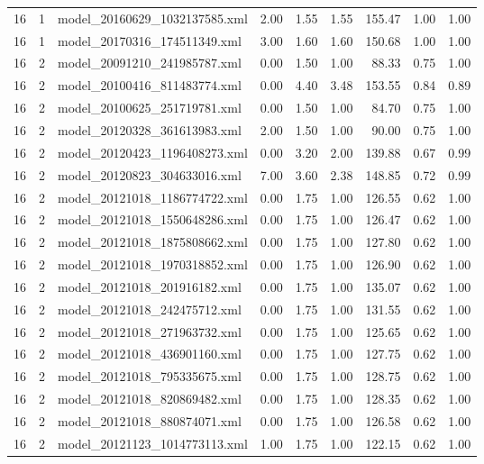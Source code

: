 \begin{table}[ht]
\begin{tabular}{rrlrrrrrr}
   16 &   1 & model\_20160629\_1032137585.xml & 2.00 & 1.55 & 1.55 & 155.47 & 1.00 & 1.00 \\ 
   16 &   1 & model\_20170316\_174511349.xml & 3.00 & 1.60 & 1.60 & 150.68 & 1.00 & 1.00 \\ 
   16 &   2 & model\_20091210\_241985787.xml & 0.00 & 1.50 & 1.00 & 88.33 & 0.75 & 1.00 \\ 
   16 &   2 & model\_20100416\_811483774.xml & 0.00 & 4.40 & 3.48 & 153.55 & 0.84 & 0.89 \\ 
   16 &   2 & model\_20100625\_251719781.xml & 0.00 & 1.50 & 1.00 & 84.70 & 0.75 & 1.00 \\ 
   16 &   2 & model\_20120328\_361613983.xml & 2.00 & 1.50 & 1.00 & 90.00 & 0.75 & 1.00 \\ 
   16 &   2 & model\_20120423\_1196408273.xml & 0.00 & 3.20 & 2.00 & 139.88 & 0.67 & 0.99 \\ 
   16 &   2 & model\_20120823\_304633016.xml & 7.00 & 3.60 & 2.38 & 148.85 & 0.72 & 0.99 \\ 
   16 &   2 & model\_20121018\_1186774722.xml & 0.00 & 1.75 & 1.00 & 126.55 & 0.62 & 1.00 \\ 
   16 &   2 & model\_20121018\_1550648286.xml & 0.00 & 1.75 & 1.00 & 126.47 & 0.62 & 1.00 \\ 
   16 &   2 & model\_20121018\_1875808662.xml & 0.00 & 1.75 & 1.00 & 127.80 & 0.62 & 1.00 \\ 
   16 &   2 & model\_20121018\_1970318852.xml & 0.00 & 1.75 & 1.00 & 126.90 & 0.62 & 1.00 \\ 
   16 &   2 & model\_20121018\_201916182.xml & 0.00 & 1.75 & 1.00 & 135.07 & 0.62 & 1.00 \\ 
   16 &   2 & model\_20121018\_242475712.xml & 0.00 & 1.75 & 1.00 & 131.55 & 0.62 & 1.00 \\ 
   16 &   2 & model\_20121018\_271963732.xml & 0.00 & 1.75 & 1.00 & 125.65 & 0.62 & 1.00 \\ 
   16 &   2 & model\_20121018\_436901160.xml & 0.00 & 1.75 & 1.00 & 127.75 & 0.62 & 1.00 \\ 
   16 &   2 & model\_20121018\_795335675.xml & 0.00 & 1.75 & 1.00 & 128.75 & 0.62 & 1.00 \\ 
   16 &   2 & model\_20121018\_820869482.xml & 0.00 & 1.75 & 1.00 & 128.35 & 0.62 & 1.00 \\ 
   16 &   2 & model\_20121018\_880874071.xml & 0.00 & 1.75 & 1.00 & 126.58 & 0.62 & 1.00 \\ 
   16 &   2 & model\_20121123\_1014773113.xml & 1.00 & 1.75 & 1.00 & 122.15 & 0.62 & 1.00 \\ 

\end{tabular}
\end{table}
